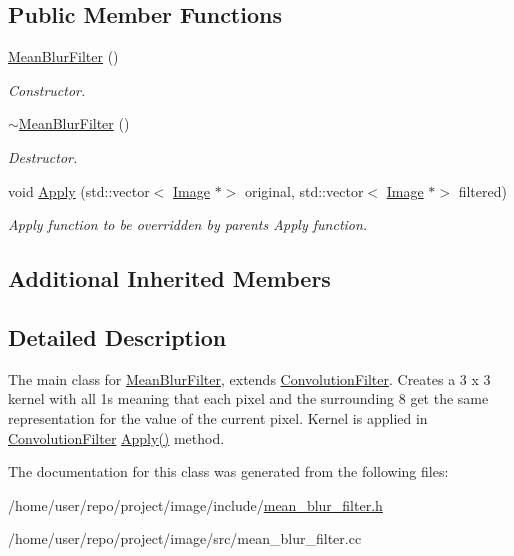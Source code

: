 \subsection*{Public Member Functions}
\begin{DoxyCompactItemize}
\item 
\mbox{\label{classMeanBlurFilter_a506584ed32d9343588264ec8e1ba3a83}} 
\hyperlink{classMeanBlurFilter_a506584ed32d9343588264ec8e1ba3a83}{Mean\+Blur\+Filter} ()
\begin{DoxyCompactList}\small\item\em Constructor. \end{DoxyCompactList}\item 
\mbox{\label{classMeanBlurFilter_a2341f00bf10c26adfd3ecaa1eb713963}} 
\hyperlink{classMeanBlurFilter_a2341f00bf10c26adfd3ecaa1eb713963}{$\sim$\+Mean\+Blur\+Filter} ()
\begin{DoxyCompactList}\small\item\em Destructor. \end{DoxyCompactList}\item 
\mbox{\label{classMeanBlurFilter_abb7824005c70b04aca6a24760f85cbc1}} 
void \hyperlink{classMeanBlurFilter_abb7824005c70b04aca6a24760f85cbc1}{Apply} (std\+::vector$<$ \hyperlink{classImage}{Image} $\ast$$>$ original, std\+::vector$<$ \hyperlink{classImage}{Image} $\ast$$>$ filtered)
\begin{DoxyCompactList}\small\item\em Apply function to be overridden by parents Apply function. \end{DoxyCompactList}\end{DoxyCompactItemize}
\subsection*{Additional Inherited Members}


\subsection{Detailed Description}
The main class for \hyperlink{classMeanBlurFilter}{Mean\+Blur\+Filter}, extends \hyperlink{classConvolutionFilter}{Convolution\+Filter}. Creates a 3 x 3 kernel with all 1\textquotesingle{}s meaning that each pixel and the surrounding 8 get the same representation for the value of the current pixel. Kernel is applied in \hyperlink{classConvolutionFilter}{Convolution\+Filter} \hyperlink{classMeanBlurFilter_abb7824005c70b04aca6a24760f85cbc1}{Apply()} method. 

The documentation for this class was generated from the following files\+:\begin{DoxyCompactItemize}
\item 
/home/user/repo/project/image/include/\hyperlink{mean__blur__filter_8h}{mean\+\_\+blur\+\_\+filter.\+h}\item 
/home/user/repo/project/image/src/mean\+\_\+blur\+\_\+filter.\+cc\end{DoxyCompactItemize}
